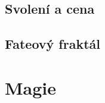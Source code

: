\subsection{Svolení a cena}
\label{sec:spec-svolenicena}


\subsection{Fateový fraktál}
\label{sec:spec-fraktal}

\section{Magie}
\label{sec:magie}






